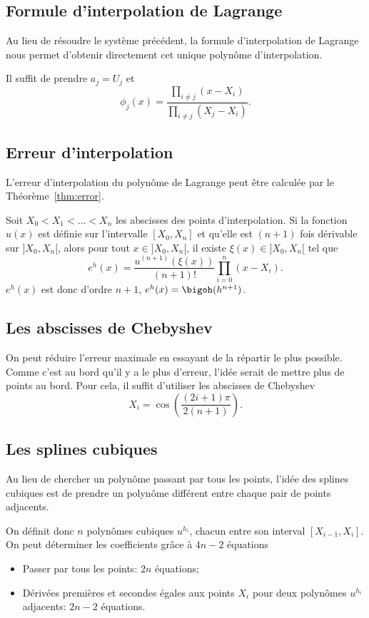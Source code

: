 \subsection{Formule d'interpolation de Lagrange}
Au lieu de résoudre le système précédent, la formule d'interpolation
de Lagrange nous permet d'obtenir directement cet unique polynôme
d'interpolation.

Il suffit de prendre $a_j = U_j$ et
\[
  \phi_j(x) = \frac{\prod_{i \neq j} (x - X_i)}
  {\prod_{i \neq j} (X_j - X_i)}.
\]

\subsection{Erreur d'interpolation}
L'erreur d'interpolation du polynôme de Lagrange peut être calculée
par le Théorème~\ref{thm:error}.
\begin{mytheo}
  \label{thm:error}
  Soit $X_0 < X_1 < \ldots < X_n$ les abscisses des points d'interpolation.
  Si la fonction $u(x)$ est définie sur l'intervalle $[X_0, X_n]$ et qu'elle
  est $(n+1)$ fois dérivable sur $]X_0, X_n[$, alors pour tout
  $x \in ]X_0, X_n[$, il existe $\xi(x) \in ]X_0, X_n[$ tel que
  \[ e^h(x) = \frac{u^{(n+1)}(\xi(x))}{(n+1)!}
  \prod_{i=0}^n (x - X_i). \]
  $e^h(x)$ est donc d'ordre $n+1$, $e^h(x) = \bigoh(h^{n+1})$.
\end{mytheo}

\subsection{Les abscisses de Chebyshev}
On peut réduire l'erreur maximale en essayant de la répartir le plus possible.
Comme c'est au bord qu'il y a le plus d'erreur, l'idée serait de mettre
plus de points au bord.
Pour cela, il suffit d'utiliser les abscisses de Chebyshev
\[ X_i = \cos\left(\frac{(2i+1)\pi}{2(n+1)}\right). \]

\subsection{Les splines cubiques}
Au lieu de chercher un polynôme passant par tous les points, l'idée des
splines cubiques est de prendre un polynôme différent entre chaque pair
de points adjacents.

On définit donc $n$ polynômes cubiques $u^{h_i}$, chacun entre son
interval $[X_{i-1}, X_i]$.
On peut déterminer les coefficients grâce à $4n-2$ équations
\begin{itemize}
  \item Passer par tous les points: $2n$ équations;
  \item Dérivées premières et secondes égales aux points $X_i$
    pour deux polynômes $u^{h_i}$ adjacents: $2n-2$ équations.
\end{itemize}

